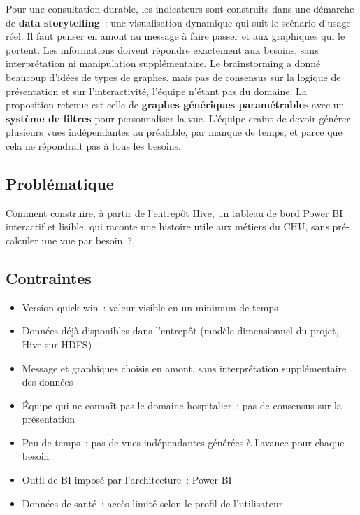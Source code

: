 \vspace{0.2cm}

\noindent Pour une consultation durable, les indicateurs sont construits dans une démarche de \textbf{data storytelling}~: une visualisation dynamique qui suit le scénario d'usage réel. Il faut penser en amont au message à faire passer et aux graphiques qui le portent. Les informations doivent répondre exactement aux besoins, sans interprétation ni manipulation supplémentaire. Le brainstorming a donné beaucoup d'idées de types de graphes, mais pas de consensus sur la logique de présentation et sur l'interactivité, l'équipe n'étant pas du domaine. La proposition retenue est celle de \textbf{graphes génériques paramétrables} avec un \textbf{système de filtres} pour personnaliser la vue. L'équipe craint de devoir générer plusieurs vues indépendantes au préalable, par manque de temps, et parce que cela ne répondrait pas à tous les besoins.

\subsection*{Problématique}
{}
\noindent Comment construire, à partir de l'entrepôt Hive, un tableau de bord Power BI interactif et lisible, qui raconte une histoire utile aux métiers du CHU, sans pré-calculer une vue par besoin~?

\subsection*{Contraintes}
{}
\begin{itemize}
	\item Version \og quick win\fg{}~: valeur visible en un minimum de temps
	\item Données déjà disponibles dans l'entrepôt (modèle dimensionnel du projet, Hive sur HDFS)
	\item Message et graphiques choisis en amont, sans interprétation supplémentaire des données
	\item Équipe qui ne connaît pas le domaine hospitalier~: pas de consensus sur la présentation
	\item Peu de temps~: pas de vues indépendantes générées à l'avance pour chaque besoin
	\item Outil de BI imposé par l'architecture~: Power BI
	\item Données de santé~: accès limité selon le profil de l'utilisateur
\end{itemize}

